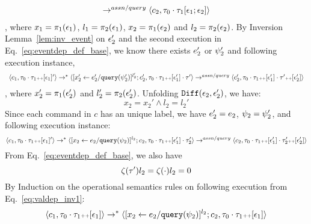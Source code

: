 \begin{subproof}
\begin{equation}
\begin{array}{l}
  \rightarrow^{assn/query} 
  \langle {c}_2,  \mathtt{\tau}_0 \cdot \mathtt{\tau}_1 [\mathtt{\epsilon}_1; \mathtt{\epsilon}_2] \rangle 
\end{array}
\end{equation}
%
, where $x_1 = \pi_1(\mathtt{\epsilon}_1)$, $l_1 = {\pi_2(\mathtt{\epsilon}_1)}$, $x_2 = \pi_1(\mathtt{\epsilon}_2)$ and $l_2 = \pi_2(\mathtt{\epsilon}_2)$.
%
By Inversion Lemma~\ref{lem:inv_event} on 
$\mathtt{\epsilon}_2'$ and the second execution in Eq.~\ref{eq:eventdep_def_base},
we know there exists $e_2'$ or $\psi_2'$ and following execution instance,
 \[
  \begin{array}{l}   
  \langle c_1, \mathtt{\tau}_0 \cdot \mathtt{\tau}_1 {\scriptscriptstyle ++} [\mathtt{\epsilon}_1]' \rangle 
  \rightarrow^{*} 
  \langle [\mathrel{ {x}_2' \leftarrow e_2' / {\tt query}(\psi_2') }]^{l_2'} ; {c}_2', \mathtt{\tau}_0 \cdot \mathtt{\tau}_1 {\scriptscriptstyle ++} [\mathtt{\epsilon}_1']\cdot \mathtt{\tau}' \rangle 
  \rightarrow^{assn/query} 
  \langle {c}_2',  \mathtt{\tau}_0 \cdot \mathtt{\tau}_1 {\scriptscriptstyle ++} [\mathtt{\epsilon}_1']\cdot \mathtt{\tau}' {\scriptscriptstyle ++} [\mathtt{\epsilon}_2'] \rangle 
\end{array}
 \]
 , where  $x_2' = \pi_1(\mathtt{\epsilon}_2')$ and $l_2' = \pi_2(\mathtt{\epsilon}_2')$.
%
Unfolding $\mathtt{Diff}(\mathtt{\epsilon}_2,\mathtt{\epsilon}_2')$, we have:
\[
  x_2 = x_2' \land l_2 = l_2' 
\] 
%
Since each command in $c$ has an unique label, we have $e_2' = e_2$, $\psi_2 = \psi_2'$, and following execution instance:
\begin{equation}
\label{eq:valdep_inv2}
  \langle c_1, \mathtt{\tau}_0 \cdot \mathtt{\tau}_1 {\scriptscriptstyle ++} [\mathtt{\epsilon}_1]' \rangle 
  \rightarrow^{*} 
  \langle [\mathrel{ {x}_2 \leftarrow e_2 / {\tt query}(\psi_2) }]^{l_2} ; {c}_2, \mathtt{\tau}_0 \cdot \mathtt{\tau}_1 {\scriptscriptstyle ++} [\mathtt{\epsilon}_1']\cdot \mathtt{\tau}_2' \rangle 
  \rightarrow^{assn/query} 
  \langle {c}_2,  \mathtt{\tau}_0 \cdot \mathtt{\tau}_1 {\scriptscriptstyle ++} [\mathtt{\epsilon}_1']\cdot \mathtt{\tau}_2' {\scriptscriptstyle ++} [\mathtt{\epsilon}_2'] \rangle 
\end{equation}
%
From Eq.~\ref{eq:eventdep_def_base}, we also have
\begin{equation}
\label{eq:valdep_invn}
  \mathtt{\zeta}(\mathtt{\tau}') l_2 = \mathtt{\zeta}( \cdot ) l_2 = 0
\end{equation}
%
%
By Induction on the operational semantics rules on following execution from Eq.~\ref{eq:valdep_inv1}: 
 \[\langle c_1, \mathtt{\tau}_0 \cdot \mathtt{\tau}_1 {\scriptscriptstyle ++} [\mathtt{\epsilon}_1] \rangle
  \rightarrow^{*} 
  \langle [\mathrel{ {x}_2 \leftarrow e_2 / {\tt query}(\psi_2) }]^{l_2};{c}_2, 
  \mathtt{\tau}_0 \cdot \mathtt{\tau}_1 {\scriptscriptstyle ++} [\mathtt{\epsilon}_1] \rangle 
\]
\end{subproof}
